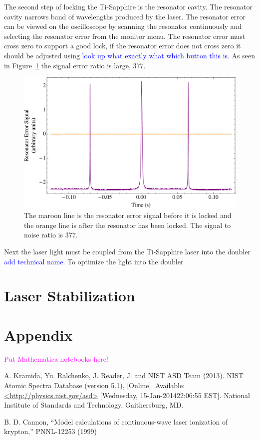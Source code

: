 \documentclass[prb,preprint]{revtex4-1}
\begin{document}
The second step of locking the Ti-Sapphire is the resonator cavity. The resonator cavity narrows  band of wavelengths produced by the laser. The resonator error can be viewed on the oscilloscope by scanning the resonator continuously and selecting the resonator error from the monitor menu. The resonator error must cross zero to support a good lock, if the resonator error does not cross zero it should be adjusted using \textcolor{blue}{look up what exactly what which button this is.} As seen in Figure~\ref{ResonatorError} the signal error ratio is large, 377.

\begin{figure}[h!]
\centering
\includegraphics[width=6in]{ResonatorError.pdf}
\caption{The maroon line is the resonator error signal before it is locked and the orange line is after the resonator has been locked. The signal to noise ratio is 377.}
\label{ResonatorError}
\end{figure}

Next the laser light must be coupled from the Ti-Sapphire laser into the doubler \textcolor{blue}{add technical name}. To optimize the light into the doubler 


\section{Laser Stabilization}

\section{Appendix}

\textcolor{magenta}{Put Mathematica notebooks here!}


\begin{thebibliography}{2}

 A. Kramida, Yu. Ralchenko, J. Reader, J. and NIST ASD Team (2013). NIST Atomic Spectra Database (version 5.1), [Online]. Available: \url{<http://physics.nist.gov/asd>} [Wednesday, 15-Jan-201422:06:55 EST]. National Institute of Standards and Technology, Gaithersburg, MD.

 B. D. Cannon, ``Model calculations of continuous-wave laser ionization of krypton,'' PNNL-12253 (1999)

\end{thebibliography}
\end{document}

